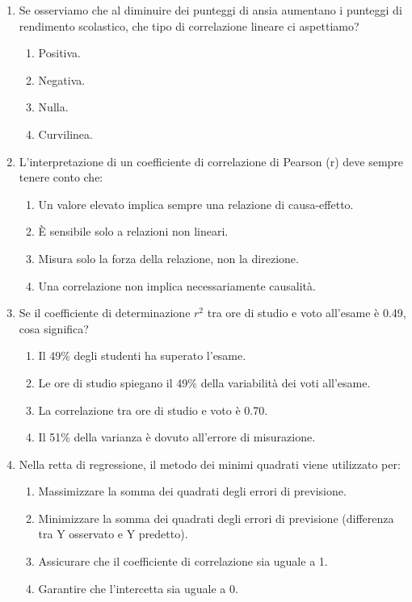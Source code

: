 \documentclass[12pt, a4paper]{article}
\begin{document}
\begin{enumerate}[resume]
    \item Se osserviamo che al diminuire dei punteggi di ansia aumentano i punteggi di rendimento scolastico, che tipo di correlazione lineare ci aspettiamo?
    \begin{enumerate}
        \item Positiva.
        \item Negativa.
        \item Nulla.
        \item Curvilinea.
    \end{enumerate}
    \vspace{0.3cm}

    \item L'interpretazione di un coefficiente di correlazione di Pearson (r) deve sempre tenere conto che:
    \begin{enumerate}
        \item Un valore elevato implica sempre una relazione di causa-effetto.
        \item È sensibile solo a relazioni non lineari.
        \item Misura solo la forza della relazione, non la direzione.
        \item Una correlazione non implica necessariamente causalità.
    \end{enumerate}
    \vspace{0.3cm}

    \item Se il coefficiente di determinazione $r^2$ tra ore di studio e voto all'esame è 0.49, cosa significa?
    \begin{enumerate}
        \item Il 49\% degli studenti ha superato l'esame.
        \item Le ore di studio spiegano il 49\% della variabilità dei voti all'esame.
        \item La correlazione tra ore di studio e voto è 0.70.
        \item Il 51\% della varianza è dovuto all'errore di misurazione.
    \end{enumerate}
    \vspace{0.3cm}

    \item Nella retta di regressione, il metodo dei minimi quadrati viene utilizzato per:
    \begin{enumerate}
        \item Massimizzare la somma dei quadrati degli errori di previsione.
        \item Minimizzare la somma dei quadrati degli errori di previsione (differenza tra Y osservato e Y predetto).
        \item Assicurare che il coefficiente di correlazione sia uguale a 1.
        \item Garantire che l'intercetta sia uguale a 0.
    \end{enumerate}
    \vspace{0.3cm}


\end{enumerate}
\end{document}

